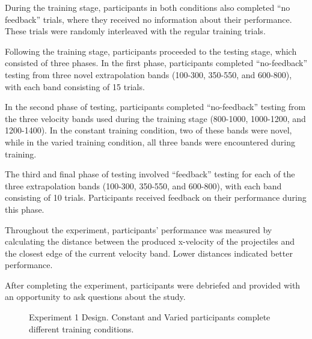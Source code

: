 \documentclass[
  letterpaper,
  DIV=11,
  numbers=noendperiod,
  oneside]{scrartcl}
\begin{document}
During the training stage, participants in both conditions also
completed ``no feedback'' trials, where they received no information
about their performance. These trials were randomly interleaved with the
regular training trials.

Following the training stage, participants proceeded to the testing
stage, which consisted of three phases. In the first phase, participants
completed ``no-feedback'' testing from three novel extrapolation bands
(100-300, 350-550, and 600-800), with each band consisting of 15 trials.

In the second phase of testing, participants completed ``no-feedback''
testing from the three velocity bands used during the training stage
(800-1000, 1000-1200, and 1200-1400). In the constant training
condition, two of these bands were novel, while in the varied training
condition, all three bands were encountered during training.

The third and final phase of testing involved ``feedback'' testing for
each of the three extrapolation bands (100-300, 350-550, and 600-800),
with each band consisting of 10 trials. Participants received feedback
on their performance during this phase.

Throughout the experiment, participants' performance was measured by
calculating the distance between the produced x-velocity of the
projectiles and the closest edge of the current velocity band. Lower
distances indicated better performance.

After completing the experiment, participants were debriefed and
provided with an opportunity to ask questions about the study.

\begin{figure}


\caption{\label{fig-design-e1}Experiment 1 Design. Constant and Varied
participants complete different training conditions.}

\end{figure}%
\end{document}

